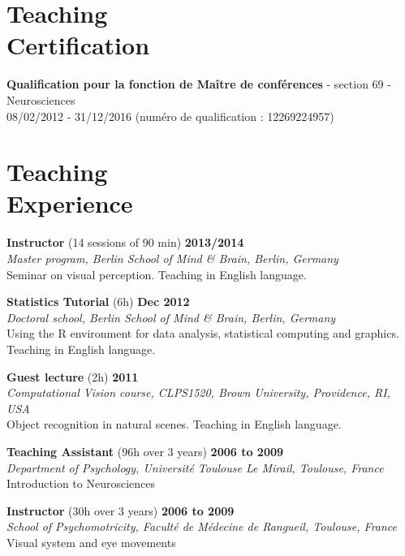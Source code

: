 \documentclass[margin,line]{resume}
\begin{document}
\begin{resume}
	\vspace{3mm}
	\section{\mysidestyle Teaching\\Certification}
    \textbf{Qualification pour la fonction de Maître de conférences} - section 69 - Neurosciences\\
    08/02/2012 - 31/12/2016 (numéro de qualification : 12269224957)


	\vspace{3mm}
    \section{\mysidestyle Teaching\\Experience}
    
    \textbf{Instructor} (14 sessions of 90 min) \hfill \textbf{2013/2014}\\
	\textsl{Master program, Berlin School of Mind \& Brain, Berlin, Germany}\\
	Seminar on visual perception. Teaching in English language.
	
    \textbf{Statistics Tutorial} (6h) \hfill \textbf{Dec 2012}\\
	\textsl{Doctoral school, Berlin School of Mind \& Brain, Berlin, Germany}\\
	Using the R environment for data analysis, statistical computing and graphics. Teaching in English language.

	\textbf{Guest lecture} (2h) \hfill \textbf{2011}\\
	\textsl{Computational Vision course, CLPS1520, Brown University, Providence, RI, USA}\\
	Object recognition in natural scenes. Teaching in English language.

	\textbf{Teaching Assistant} (96h over 3 years) \hfill \textbf{2006 to 2009}\\
	\textsl{Department of Psychology, Université Toulouse Le Mirail, Toulouse, France}\\
	Introduction to Neurosciences

	\textbf{Instructor} (30h over 3 years) \hfill \textbf{2006 to 2009}\\
	\textsl{School of Psychomotricity, Faculté de Médecine de Rangueil, Toulouse, France}\\
	Visual system and eye movements


\end{resume}
\end{document}
